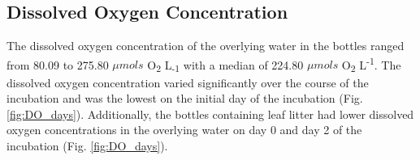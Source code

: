 \subsection{Dissolved Oxygen Concentration}

The dissolved oxygen concentration of the overlying water in the bottles ranged from 80.09 to 275.80 $\mu mols$ O\textsubscript{2} L\textsubscript{-1} with a median of 224.80 $\mu mols$ O\textsubscript{2} L\textsuperscript{-1}.  The dissolved oxygen concentration varied significantly over the course of the incubation and was the lowest on the initial day of the incubation (Fig. \ref{fig:DO_days}). Additionally, the bottles containing leaf litter had lower dissolved oxygen concentrations in the overlying water on day 0 and day 2 of the incubation (Fig. \ref{fig:DO_days}). 



